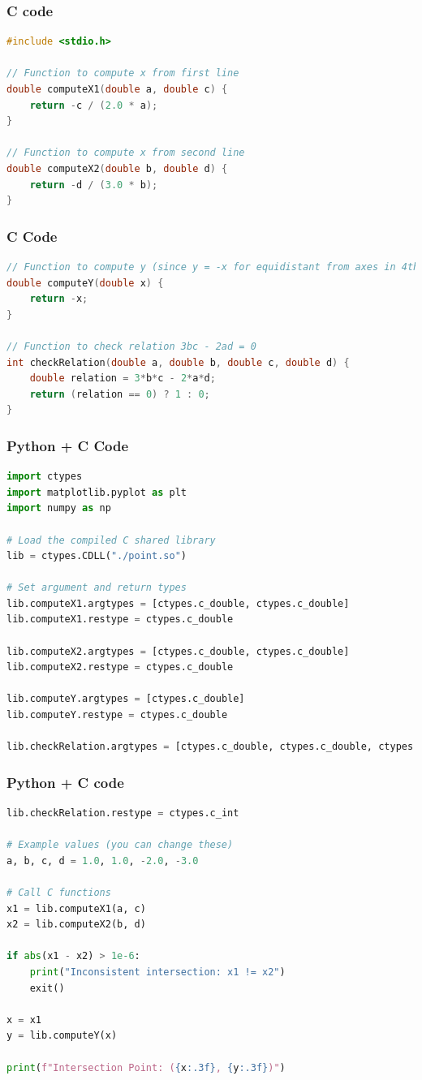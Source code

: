 \documentclass{beamer}
\begin{document}
\begin{frame}[fragile]
\frametitle{C code}
    \begin{lstlisting}[language=C]
#include <stdio.h>

// Function to compute x from first line
double computeX1(double a, double c) {
    return -c / (2.0 * a);
}

// Function to compute x from second line
double computeX2(double b, double d) {
    return -d / (3.0 * b);
}
\end{lstlisting}
\end{frame}
\begin{frame}[fragile]
    \frametitle{C Code }
    \begin{lstlisting}[language=C]
// Function to compute y (since y = -x for equidistant from axes in 4th quadrant)
double computeY(double x) {
    return -x;
}

// Function to check relation 3bc - 2ad = 0
int checkRelation(double a, double b, double c, double d) {
    double relation = 3*b*c - 2*a*d;
    return (relation == 0) ? 1 : 0;
}


     \end{lstlisting}
\end{frame}
\begin{frame}[fragile]
    \frametitle{Python + C Code }
    \begin{lstlisting}[language=Python]
import ctypes
import matplotlib.pyplot as plt
import numpy as np

# Load the compiled C shared library
lib = ctypes.CDLL("./point.so")

# Set argument and return types
lib.computeX1.argtypes = [ctypes.c_double, ctypes.c_double]
lib.computeX1.restype = ctypes.c_double

lib.computeX2.argtypes = [ctypes.c_double, ctypes.c_double]
lib.computeX2.restype = ctypes.c_double

lib.computeY.argtypes = [ctypes.c_double]
lib.computeY.restype = ctypes.c_double

lib.checkRelation.argtypes = [ctypes.c_double, ctypes.c_double, ctypes.c_double, ctypes.c_double]

    \end{lstlisting}
\end{frame}

\begin{frame}[fragile]
    \frametitle{Python + C code}

    \begin{lstlisting}[language=Python]
lib.checkRelation.restype = ctypes.c_int

# Example values (you can change these)
a, b, c, d = 1.0, 1.0, -2.0, -3.0

# Call C functions
x1 = lib.computeX1(a, c)
x2 = lib.computeX2(b, d)

if abs(x1 - x2) > 1e-6:
    print("Inconsistent intersection: x1 != x2")
    exit()

x = x1
y = lib.computeY(x)

print(f"Intersection Point: ({x:.3f}, {y:.3f})")

    \end{lstlisting}
\end{frame}
\end{document}
